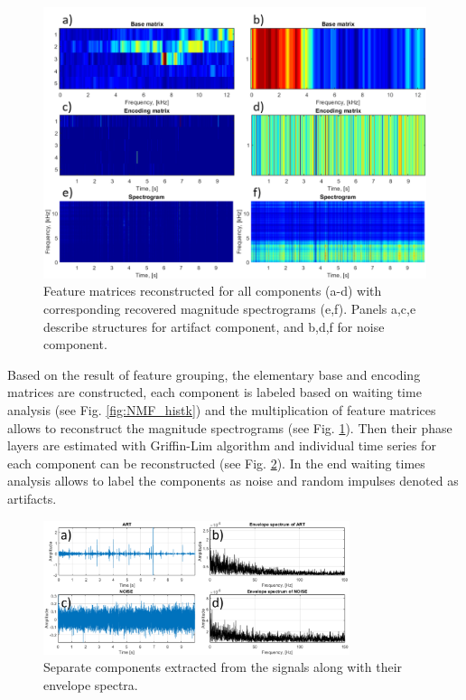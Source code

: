 \documentclass[3p,times]{elsarticle}
\begin{document}
\begin{figure}[ht!]
\centering
\includegraphics[width=\textwidth]{figs/resk.png}
\caption{Feature matrices reconstructed for all components (a-d) with corresponding recovered magnitude spectrograms (e,f). Panels a,c,e describe structures for artifact component, and b,d,f for noise component.}
\label{fig:NMF_resultk}
\end{figure}

Based on the result of feature grouping, the elementary base and encoding matrices are constructed, each component is labeled based on waiting time analysis (see Fig. \ref{fig:NMF_histk}) and the  multiplication of feature matrices allows to reconstruct the magnitude spectrograms (see Fig. \ref{fig:NMF_resultk}). Then their phase layers are estimated with Griffin-Lim algorithm and individual time series for each component can be reconstructed (see Fig. \ref{fig:NMF_outk}). In the end waiting times analysis allows to label the components as noise and random impulses denoted as artifacts.



\begin{figure}[ht!]
\centering
\includegraphics[width=0.8\textwidth]{figs/outk.png}
\caption{Separate components extracted from the signals along with their envelope spectra.}
\label{fig:NMF_outk}
\end{figure}
\end{document}
